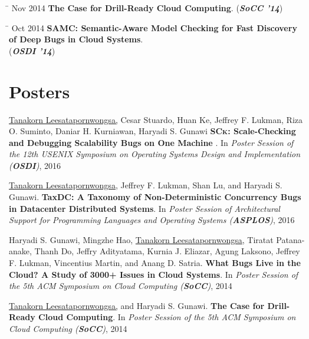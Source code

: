 \documentclass[10pt]{article} %
\begin{document}
\begin{tabbing}
\hspace{2.5cm} \= \kill
Nov 2014 \> \textbf{The Case for Drill-Ready Cloud Computing}. (\textbf{\textit{SoCC '14}})
\end{tabbing}

\begin{tabbing}
\hspace{2.5cm} \= \kill
Oct 2014 \> \textbf{SAMC: Semantic-Aware Model Checking for Fast Discovery of Deep Bugs in Cloud Systems}. \\
\> (\textbf{\textit{OSDI '14}})
\end{tabbing}


\section{Posters}

\underline{Tanakorn Leesatapornwongsa,} Cesar Stuardo, Huan Ke, Jeffrey F.
Lukman, Riza O. Suminto, Daniar H. Kurniawan, Haryadi S. Gunawi
\textbf{\textsc{SCk}: Scale-Checking and Debugging Scalability Bugs on One
Machine }. In \textit{Poster Session of the 12th USENIX Symposium on Operating
Systems Design and Implementation (\textbf{OSDI})}, 2016
\vspace{2mm}

\underline{Tanakorn Leesatapornwongsa,} Jeffrey F. Lukman, Shan Lu, and Haryadi
S. Gunawi. \textbf{TaxDC: A Taxonomy of Non-Deterministic Concurrency Bugs in
Datacenter Distributed Systems}. In \textit{Poster Session of Architectural
Support for Programming Languages and Operating Systems (\textbf{ASPLOS})}, 2016
\vspace{2mm}

Haryadi S. Gunawi, Mingzhe Hao, \underline{Tanakorn Leesatapornwongsa}, Tiratat
Patana-anake, Thanh Do, Jeffry Adityatama, Kurnia J. Eliazar, Agung Laksono,
Jeffrey F. Lukman, Vincentius Martin, and Anang D. Satria. \textbf{What Bugs
Live in the Cloud? A Study of 3000+ Issues in Cloud Systems}. In
\textit{Poster Session of the 5th ACM Symposium on Cloud Computing (\textbf{SoCC})}, 2014
\vspace{2mm}

\underline{Tanakorn Leesatapornwongsa,} and Haryadi S. Gunawi. \textbf{The Case
for Drill-Ready Cloud Computing}. In \textit{Poster Session of the 5th ACM
Symposium on Cloud Computing (\textbf{SoCC})}, 2014
\vspace{2mm}
\end{document}
